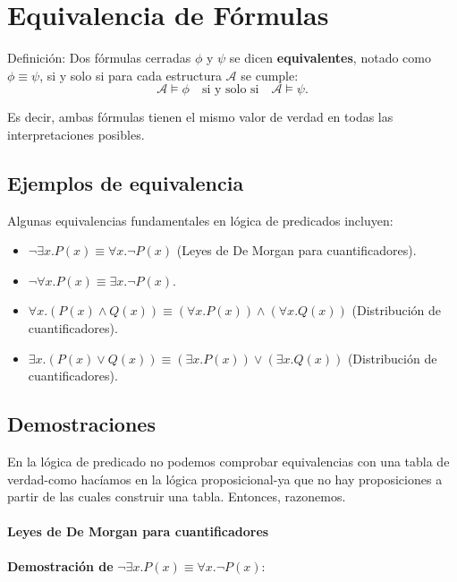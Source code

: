 \section{Equivalencia de Fórmulas}

\begin{definitionblock}{Definición:}
Dos fórmulas cerradas $\phi$ y $\psi$ se dicen \textbf{equivalentes}, notado como $\phi \equiv \psi$, si y solo si para cada estructura $\mathcal{A}$ se cumple:
\begin{equation}
    \mathcal{A} \models \phi \quad \text{si y solo si} \quad \mathcal{A} \models \psi.
\end{equation}
\end{definitionblock}
Es decir, ambas fórmulas tienen el mismo valor de verdad en todas las interpretaciones posibles.

\subsection{Ejemplos de equivalencia}
Algunas equivalencias fundamentales en lógica de predicados incluyen:
\begin{itemize}
    \item $\lnot \exists x. P(x) \equiv \forall x. \lnot P(x)$ (Leyes de De Morgan para cuantificadores).
    \item $\lnot \forall x. P(x) \equiv \exists x. \lnot P(x)$.
    \item $\forall x. (P(x) \land Q(x)) \equiv (\forall x. P(x)) \land (\forall x. Q(x))$ (Distribución de cuantificadores).
    \item $\exists x. (P(x) \lor Q(x)) \equiv (\exists x. P(x)) \lor (\exists x. Q(x))$ (Distribución de cuantificadores).
\end{itemize}

\subsection{Demostraciones}
 En la lógica de predicado no podemos comprobar equivalencias con una tabla de verdad-como hacíamos en la lógica proposicional-ya que no hay proposiciones a partir de las cuales construir una tabla. Entonces, razonemos.

\paragraph{Leyes de De Morgan para cuantificadores}
\textbf{Demostración de} $\lnot \exists x. P(x) \equiv \forall x. \lnot P(x)$:

